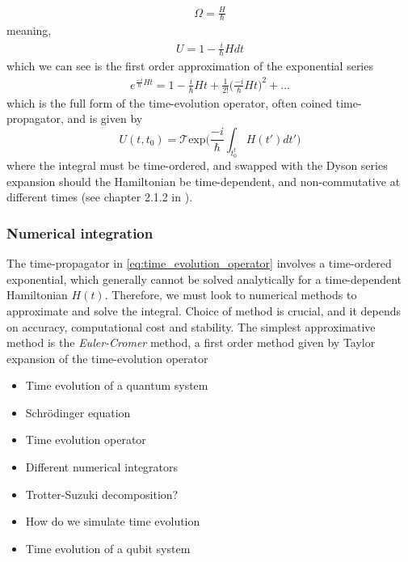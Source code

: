 \documentclass{subfiles}
\begin{document}
\begin{align*}
    \Omega = \frac{H}{\hbar}
\end{align*}
meaning, 
\begin{align*}
    U = 1 - \frac{i}{\hbar}Hdt
\end{align*}
which we can see is the first order approximation of the exponential series
\begin{align*}
    e^{\frac{-i}{\hbar}Ht} = 1 - \frac{i}{\hbar}Ht + \frac{1}{2!}\bigg(\frac{-i}{\hbar}Ht\bigg)^2 + ...
\end{align*}
which is the full form of the time-evolution operator, often coined time-propagator, and is given by
\begin{equation}
    U(t, t_0) = \mathcal{T}\text{exp}\bigg(\frac{-i}{\hbar}\int_t_0^tH(t')dt'\bigg)\label{eq:time_evolution_operator}
\end{equation}
where the integral must be time-ordered, and swapped with the Dyson series expansion should the Hamiltonian be time-dependent, and non-commutative at different times (see chapter 2.1.2 in \cite{sakurai1986modern}). 
\subsubsection{Numerical integration}
The time-propagator in \eqref{eq:time_evolution_operator} involves a time-ordered exponential, which generally cannot be solved analytically for a time-dependent Hamiltonian $H(t)$. Therefore, we must look to numerical methods to approximate and solve the integral. Choice of method is crucial, and it depends on accuracy, computational cost and stability. The simplest approximative method is the \emph{Euler-Cromer} method, a first order method given by Taylor expansion of the time-evolution operator


\begin{itemize}
    \item Time evolution of a quantum system
    \item Schrödinger equation
    \item Time evolution operator
    \item Different numerical integrators
    \item Trotter-Suzuki decomposition?
    \item How do we simulate time evolution
    \item Time evolution of a qubit system
\end{itemize}
\end{document}
